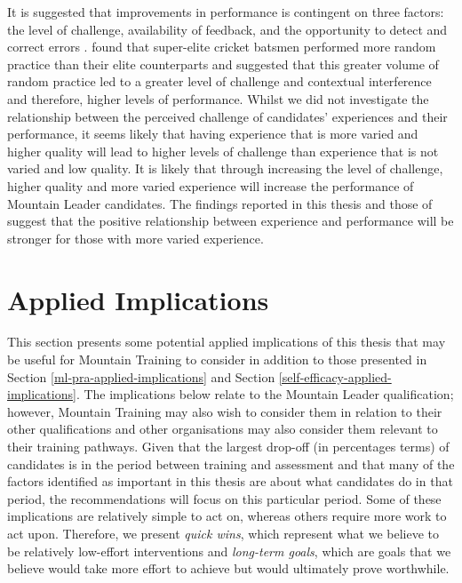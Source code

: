 \documentclass[
  12pt,
  a4paper,
]{book}
\begin{document}
It is suggested that improvements in performance is contingent on three factors: the level of challenge, availability of feedback, and the opportunity to detect and correct errors \citep{Ericsson1993, Guadangnoli2004}. \citet{Jones2020} found that super-elite cricket batsmen performed more random practice than their elite counterparts and suggested that this greater volume of random practice led to a greater level of challenge and contextual interference and therefore, higher levels of performance. Whilst we did not investigate the relationship between the perceived challenge of candidates' experiences and their performance, it seems likely that having experience that is more varied and higher quality will lead to higher levels of challenge than experience that is not varied and low quality. It is likely that through increasing the level of challenge, higher quality and more varied experience will increase the performance of Mountain Leader candidates. The findings reported in this thesis and those of \citet{Jones2020} suggest that the positive relationship between experience and performance will be stronger for those with more varied experience.

\hypertarget{gen-discussion-applied-implications}{%
\section{Applied Implications}\label{gen-discussion-applied-implications}}

This section presents some potential applied implications of this thesis that may be useful for Mountain Training to consider in addition to those presented in Section \ref{ml-pra-applied-implications} and Section \ref{self-efficacy-applied-implications}. The implications below relate to the Mountain Leader qualification; however, Mountain Training may also wish to consider them in relation to their other qualifications and other organisations may also consider them relevant to their training pathways. Given that the largest drop-off (in percentages terms) of candidates is in the period between training and assessment and that many of the factors identified as important in this thesis are about what candidates do in that period, the recommendations will focus on this particular period. Some of these implications are relatively simple to act on, whereas others require more work to act upon. Therefore, we present \emph{quick wins}, which represent what we believe to be relatively low-effort interventions and \emph{long-term goals}, which are goals that we believe would take more effort to achieve but would ultimately prove worthwhile.
\end{document}
